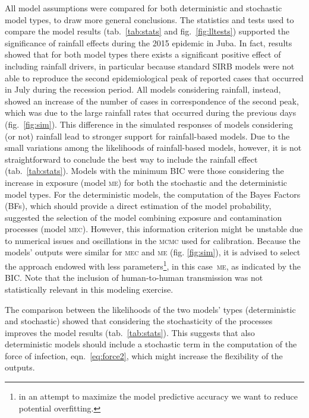 All model assumptions were compared for both deterministic and stochastic model types, to draw more general conclusions. The statistics and tests used to compare the model results  (tab.~\ref{tab:stats} and fig.~\ref{fig:lltests}) supported the significance of rainfall effects during the 2015 epidemic in Juba. In fact, results showed that for both model types there exists a significant positive effect of including rainfall drivers, in particular because standard SIRB models were not able to reproduce the second epidemiological peak of reported cases that occurred in July during the recession period. All models considering rainfall, instead, showed an increase of the number of cases in correspondence of the second peak, which was due to the large rainfall rates that occurred during the previous days (fig.~\ref{fig:sim}). 
This difference in the simulated responses of models considering (or not) rainfall lead to stronger support for rainfall-based models. Due to the small variations among the likelihoods of rainfall-based models, however, it is not straightforward to conclude the best way to include the rainfall effect (tab.~\ref{tab:stats}).
Models with the minimum BIC were those considering the increase in exposure (model \textsc{me}) for both the stochastic and the deterministic model types. For the deterministic models, the computation of the Bayes Factors (BFs), which should provide a direct estimation of the model probability, suggested the selection of the model combining exposure and contamination processes (model \textsc{mec}). However, this information criterion might be unstable due to numerical issues and oscillations in the \textsc{mcmc} used for calibration\cite{Raftery:EstimatingIntegratedLikelihood:2007}. Because the models' outputs were similar for \textsc{mec} and \textsc{me} (fig. \ref{fig:sim}), it is advised to select the approach endowed with less parameters\footnote{in an attempt to maximize the model predictive accuracy we want to reduce potential overfitting.}, in this case~\textsc{me}, as indicated by the BIC. Note that the inclusion of human-to-human transmission was not statistically relevant in this modeling exercise.

The comparison between the likelihoods of the two models' types (deterministic and stochastic) showed that considering the stochasticity of the processes improves the model results (tab.~\ref{tab:stats}). This suggests that also deterministic models should include a stochastic term in the computation of the force of infection, eqn.~\eqref{eq:force2}, which might increase the flexibility of the outputs.


